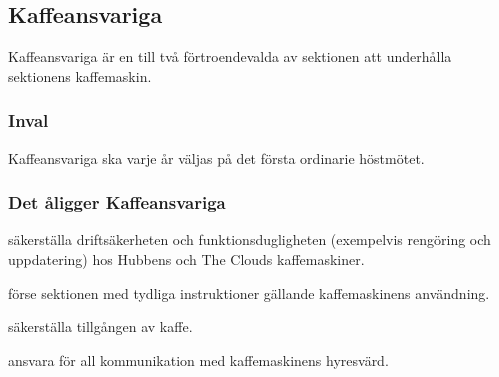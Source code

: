 \subsection{Kaffeansvariga}
Kaffeansvariga är en till två förtroendevalda av sektionen att underhålla sektionens kaffemaskin.

\subsubsection{Inval}
Kaffeansvariga ska varje år väljas på det första ordinarie höstmötet. 

\subsubsection{Det åligger Kaffeansvariga}
\begin{att}
    \item säkerställa driftsäkerheten och funktionsdugligheten (exempelvis rengöring och uppdatering) hos Hubbens och The Clouds kaffemaskiner.
    \item förse sektionen med tydliga instruktioner gällande kaffemaskinens användning.
    \item säkerställa tillgången av kaffe.
    \item ansvara för all kommunikation med kaffemaskinens hyresvärd.
\end{att}